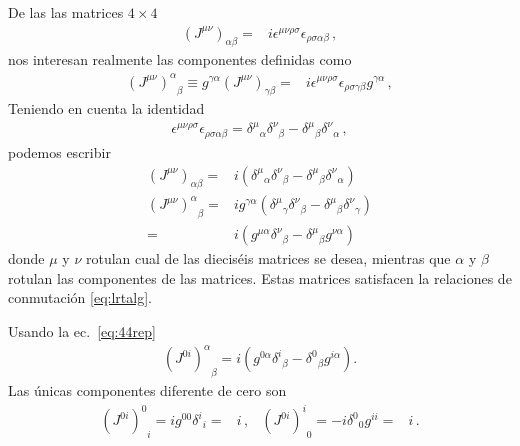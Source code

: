 \begin{frame}
De las las  matrices $4\times 4$ 
\begin{align}
   \left(J^{\mu\nu}\right)_{\alpha\beta}=&i\epsilon^{\mu\nu\rho\sigma}\epsilon_{\rho\sigma\alpha\beta}\,,
\end{align}
nos interesan realmente las componentes definidas como
\begin{align}
    { \left(J^{\mu\nu}\right)^{\alpha}}_{\beta}\equiv g^{\gamma\alpha}\left(J^{\mu\nu}\right)_{\gamma\beta}= &i\epsilon^{\mu\nu\rho\sigma}\epsilon_{\rho\sigma\gamma\beta}g^{\gamma\alpha}\,,
\end{align}
Teniendo en cuenta la identidad
\begin{align}
  \epsilon^{\mu\nu\rho\sigma}\epsilon_{\rho\sigma\alpha\beta}=
  {\delta^\mu}_\alpha{\delta^\nu}_\beta-{\delta^\mu}_\beta{\delta^\nu}_\alpha\,,
\end{align}
podemos escribir
\begin{align}
  \label{eq:44rep}
  \left(J^{\mu\nu}\right)_{\alpha\beta}  =&i\left({\delta^\mu}_\alpha{\delta^\nu}_\beta-{\delta^\mu}_\beta{\delta^\nu}_\alpha\right)\nonumber\\
 {\left(J^{\mu\nu}\right)^{\alpha}}_{\beta}=&ig^{\gamma\alpha}\left({\delta^{\mu}}_{\gamma}{\delta^\nu}_\beta-{\delta^\mu}_\beta{\delta^{\nu}}_\gamma\right) \nonumber\\
 =  &i\left(g^{\mu\alpha}{\delta^\nu}_\beta-{\delta^\mu}_\beta g^{\nu\alpha}\right)
\end{align}
donde $\mu$ y $\nu$ rotulan cual de las dieciséis matrices se desea, mientras que $\alpha$ y $\beta$ rotulan las componentes de las matrices. Estas matrices satisfacen la relaciones de conmutación \eqref{eq:lrtalg}.

Usando la ec.~\eqref{eq:44rep}
\begin{align}
  {\left( J^{0i} \right)^{\alpha}}_{\beta}=
  i\left(g^{0\alpha}{\delta^i}_\beta-{\delta^0}_\beta g^{i\alpha}\right).
\end{align}
Las únicas componentes diferente de cero son
\begin{align}
  {\left( J^{0i} \right)^{0}}_{i}=ig^{00}{\delta^i}_i=&i\,,&
  {\left( J^{0i} \right)^{i}}_{0}=-i {\delta^0}_0 g^{ii}=&i\,.
\end{align}


\end{frame}
